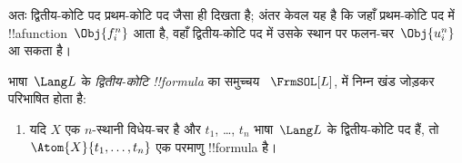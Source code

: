 \documentclass[../../../include/open-logic-section]{subfiles}
\begin{document}
\begin{explain}
अतः द्वितीय-कोटि पद प्रथम-कोटि पद जैसा ही दिखता है; अंतर केवल यह है कि जहाँ
प्रथम-कोटि पद में !!a{function}~$\Obj{f^n_i}$ आता है, वहाँ द्वितीय-कोटि पद
में उसके स्थान पर फलन-चर~$\Obj{u^n_i}$ आ सकता है।
\end{explain}

\begin{defn}
भाषा~$\Lang L$ के \emph{द्वितीय-कोटि !!{formula}} का समुच्चय
~$\FrmSOL[L]$,  में निम्न खंड जोड़कर
परिभाषित होता है:
\begin{enumerate}
\item यदि $X$ एक $n$-स्थानी विधेय-चर है और $t_1$, \dots, $t_n$
  भाषा~$\Lang L$ के द्वितीय-कोटि पद हैं, तो
  $\Atom{X}{t_1,\ldots, t_n}$ एक परमाणु !!{formula} है।




\end{enumerate}
\end{defn}
\end{document}
